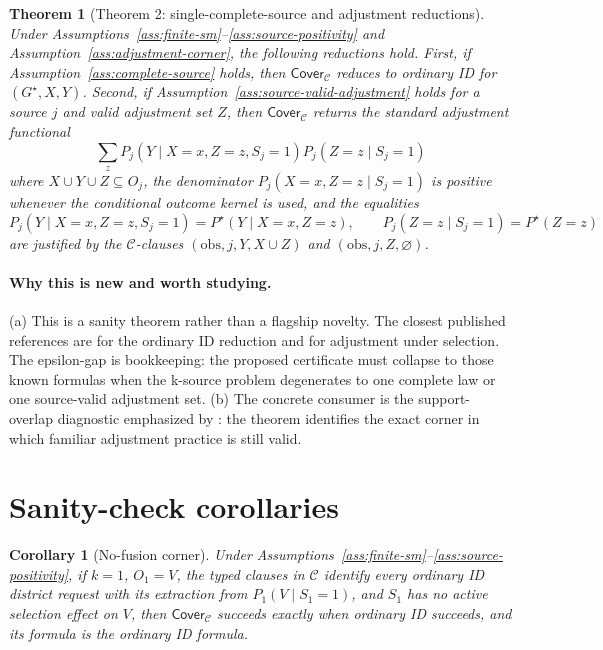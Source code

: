 \documentclass[11pt]{article}
\theoremstyle{definition}
\theoremstyle{plain}
\newtheorem{theorem}{Theorem}
\newtheorem{corollary}{Corollary}
\theoremstyle{remark}
\begin{document}
\begin{theorem}[Theorem 2: single-complete-source and adjustment reductions]\label{thm:reductions}
Under Assumptions~\ref{ass:finite-sm}--\ref{ass:source-positivity} and
Assumption~\ref{ass:adjustment-corner}, the following reductions hold.
First, if Assumption~\ref{ass:complete-source} holds, then
\(\mathsf{Cover}_{\mathcal C}\) reduces to ordinary ID for
\((G^\star,X,Y)\).  Second, if
Assumption~\ref{ass:source-valid-adjustment} holds for a source \(j\) and
valid adjustment set \(Z\), then \(\mathsf{Cover}_{\mathcal C}\) returns the
standard adjustment functional
\[
  \sum_z P_j(Y\mid X=x,Z=z,S_j=1) P_j(Z=z\mid S_j=1)
\]
where \(X\cup Y\cup Z\subseteq O_j\), the denominator
\(P_j(X=x,Z=z\mid S_j=1)\) is positive whenever the conditional outcome
kernel is used, and the equalities
\[
  P_j(Y\mid X=x,Z=z,S_j=1)=P^\star(Y\mid X=x,Z=z),
  \qquad
  P_j(Z=z\mid S_j=1)=P^\star(Z=z)
\]
are justified by the \(\mathcal C\)-clauses
\((\mathrm{obs},j,Y,X\cup Z)\) and
\((\mathrm{obs},j,Z,\varnothing)\).
\end{theorem}
\paragraph{Why this is new and worth studying.}
(a) This is a sanity theorem rather than a flagship novelty.  The closest
published references are \citet{ShpitserPearl2008CompleteID} for the ordinary
ID reduction and \citet{CorreaTianBareinboim2018Adjustment} for adjustment
under selection.  The epsilon-gap is bookkeeping: the proposed certificate
must collapse to those known formulas when the k-source problem degenerates
to one complete law or one source-valid adjustment set.  (b) The concrete
consumer is the support-overlap diagnostic emphasized by
\citet{DegtiarRose2023Generalizability}: the theorem identifies the exact
corner in which familiar adjustment practice is still valid.

\section{Sanity-check corollaries}
\begin{corollary}[No-fusion corner]\label{cor:no-fusion}
Under Assumptions~\ref{ass:finite-sm}--\ref{ass:source-positivity}, if
\(k=1\), \(O_1=V\), the typed clauses in \(\mathcal C\) identify every
ordinary ID district request with its extraction from
\(P_1(V\mid S_1=1)\), and \(S_1\) has no active selection effect on \(V\), then
\(\mathsf{Cover}_{\mathcal C}\) succeeds exactly when ordinary ID succeeds,
and its formula is the ordinary ID formula.
\end{corollary}
\end{document}
